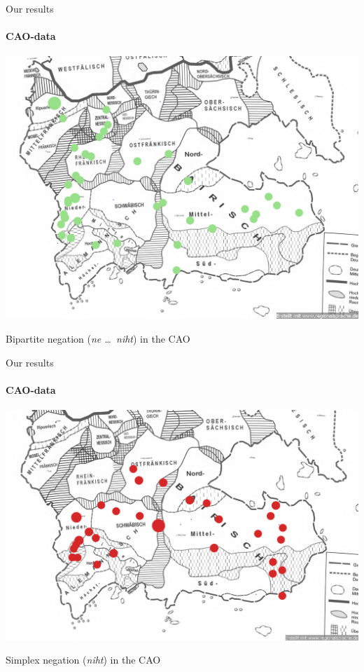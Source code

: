 \documentclass[xcolor=table, compress, %
handout
]{beamer}
\begin{document}
\begin{frame}{Our results}
\framesubtitle{CAO-data}

\begin{table}
\begin{center}
\includegraphics[scale=1.4]{Doppelnegationneu.png}
\end{center}
\caption{Bipartite negation (\textit{ne \ldots\ niht}) in the CAO}
\end{table}


\end{frame}


\begin{frame}{Our results}
\framesubtitle{CAO-data}

\begin{table}
\begin{center}
\includegraphics[scale=1.7]{Einfachnegationneu.png}
\end{center}
\caption{Simplex negation (\textit{niht}) in the CAO}
\end{table}


\end{frame}
\end{document}

